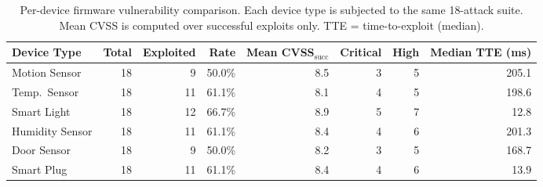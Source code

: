 \begin{table}[t]
\centering
\caption{Per-device firmware vulnerability comparison. Each device type is subjected to the same 18-attack suite. Mean CVSS is computed over successful exploits only. TTE = time-to-exploit (median).}
\label{tab:device-comparison}
\small
\setlength{\tabcolsep}{4pt}
\begin{tabular}{lrrrrrrr}
\toprule
\textbf{Device Type} & \textbf{Total} & \textbf{Exploited} & \textbf{Rate} &
\textbf{Mean CVSS$_{\text{succ}}$} & \textbf{Critical} & \textbf{High} & \textbf{Median TTE (ms)} \\
\midrule
Motion Sensor   & 18 & 9  & 50.0\% & 8.5 & 3 & 5 & 205.1 \\
Temp.\ Sensor   & 18 & 11 & 61.1\% & 8.1 & 4 & 5 & 198.6 \\
Smart Light     & 18 & 12 & 66.7\% & 8.9 & 5 & 7 & 12.8  \\
Humidity Sensor & 18 & 11 & 61.1\% & 8.4 & 4 & 6 & 201.3 \\
Door Sensor     & 18 & 9  & 50.0\% & 8.2 & 3 & 5 & 168.7 \\
Smart Plug      & 18 & 11 & 61.1\% & 8.4 & 4 & 6 & 13.9  \\
\bottomrule
\end{tabular}
\end{table}
